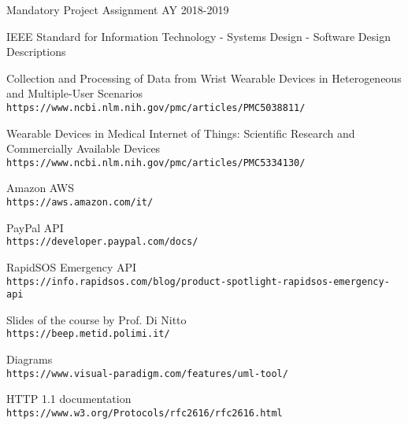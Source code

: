 \documentclass[../DD0.tex]{subfiles}
\begin{document}
\begin{thebibliography}{9}
   Mandatory Project Assignment AY 2018-2019

   IEEE Standard for Information Technology - Systems Design - Software Design Descriptions

   Collection and Processing of Data from Wrist Wearable Devices in Heterogeneous and Multiple-User Scenarios\\
  \texttt{https://www.ncbi.nlm.nih.gov/pmc/articles/PMC5038811/}

   Wearable Devices in Medical Internet of Things: Scientific Research and Commercially Available Devices\\
  \texttt{https://www.ncbi.nlm.nih.gov/pmc/articles/PMC5334130/}

  Amazon AWS\\
  \texttt{https://aws.amazon.com/it/}

   PayPal API\\
  \texttt{https://developer.paypal.com/docs/}

   RapidSOS Emergency API\\
  \texttt{https://info.rapidsos.com/blog/product-spotlight-rapidsos-emergency-api}

  Slides of the course by Prof. Di Nitto\\
  \texttt{https://beep.metid.polimi.it/}

  Diagrams\\
  \texttt{https://www.visual-paradigm.com/features/uml-tool/}

  HTTP 1.1 documentation\\
  \texttt{https://www.w3.org/Protocols/rfc2616/rfc2616.html}




\end{thebibliography}
\end{document}
